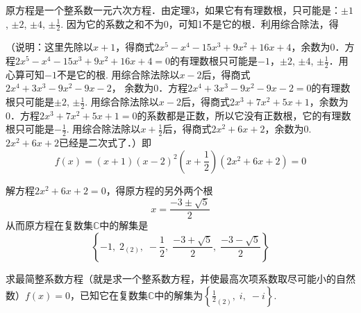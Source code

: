 \begin{solution}
    原方程是一个整系数一元六次方程．由定理3，如果它有有理数根，只可能是：$\pm 1$, $\pm2$, $\pm4$, $\pm\frac{1}{2}$. 因为它的系数之和不为0，可知1不是它的根．利用综合除法，得
 \begin{center}
\end{center}

（说明：这里先除以$x+1$，得商式$2x^5-x^4-15x^3+9x^2+16x+4$，余数为0．方程$2x^5-x^4-15x^3+9x^2+16x+4=0$的有理数根只可能是$-1$，$\pm 2$, $\pm4$, $\pm\frac{1}{2}$．用心算可知$-1$不是它的根. 用综合除法除以$x-2$后，得商式$2x^4+3x^3-9x^2-9x-2$，
余数为0．方程$2x^4+3x^3-9x^2-9x-2=0$的有理数根只可能是$\pm 2$, $\pm\frac{1}{2}$. 用综合除法除以$x-2$后，得商式$2x^3+7x^2+5x+1$，余数为0．方程$2x^3+7x^2+5x+1=0$的系数都是正数，所以它没有正数根，它的有理数根只可能是$-\frac{1}{2}$. 用综合除法除以$x+\frac{1}{2}$后，得商式$2x^2+6x+2$，余数为0. $2x^2+6x+2$已经是二次式了．）即
\[f(x)=(x+1)(x-2)^2\left(x+\frac{1}{2}\right)(2x^2+6x+2)=0\]

解方程$2x^2+6x+2=0$，得原方程的另外两个根
\[x=\frac{-3\pm\sqrt{5}}{2}\]
从而原方程在复数集$\mathbb{C}$中的解集是
\[\left\{-1,\; 2_{(2)},\; -\frac{1}{2},\; \frac{-3+\sqrt{5}}{2},\; \frac{-3-\sqrt{5}}{2}\right\}\]
\end{solution}

\begin{example}
    求最简整系数方程（就是求一个整系数方程，并使最高次项系数取尽可能小的自然数）$f(x)=0$，已知它在复数集$\mathbb{C}$中的解集为$\left\{\frac{1}{2}_{(2)},\; i,\; -i\right\}$.
\end{example}

